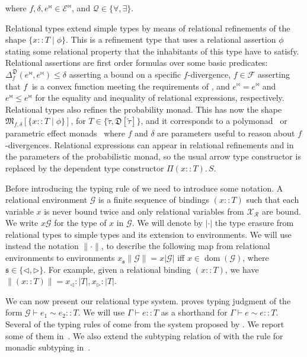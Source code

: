 \documentclass{sig-alternate-05-2015}
\theoremstyle{plain}
\theoremstyle{definition}
\theoremstyle{corollary}
\newcommand{\coty}[1]{\widetilde{#1}}
\def\lvmark{\triangleleft}
\def\rvmark{\triangleright}
\renewcommand{\l}[1]{#1_\lvmark}
\renewcommand{\r}[1]{#1_\rvmark}
\def\svar{\mathfrak{s}}
\newcommand{\rembed}[1]{|{#1}|}
\newcommand{\rrembed}[1]{\|{#1}\|}
\newcommand{\rmark}[1]{{#1}^{\Join}}
\def\rvars{\ensuremath{\mathcal{X}_{\mathcal{R}}}\xspace}
\newcommand{\expr}[0]{\ensuremath{\mathcal{E}}}
\newcommand{\rexpr}[0]{\ensuremath{\expr^{\Join}}}
\newcommand{\rtmod}[3]{\mathfrak{M}_{#1,#2}[{#3}]}
\newcommand{\rtprod}[3]{\Pi ({#1} :: {#2}) .\, {#3}}
\newcommand{\rtref}[3]{\{ {#1} :: {#2} \vbar {#3} \}}
\def\quantvar{\mathcal{Q}}
\newcommand{\renv}[1]{\mathcal{#1}}
\DeclareMathOperator{\dom}{dom}
\newcommand{\vbar}[0]{\mathrel{|}}
\newcommand{\stdist}[1]{\mathfrak{D}[{#1}]}
\newcommand{\fdiv}{\ensuremath{f}}
\begin{document}
\noindent where $\fdiv, \delta, \rmark{e} \in \rexpr$,
and $\quantvar\in\{\forall, \exists\}$.

Relational types extend simple types by means of relational
refinements of the shape $\rtref{x}{T}{\phi}$. This is a refinement
type that uses a relational assertion $\phi$ stating some relational
property that the inhabitants of this type have to satisfy. Relational
assertions are first order formulas over some basic predicates:
$\Delta^{\mathfrak{D}}_\fdiv(\rmark{e},\rmark{e})\leq \delta$
asserting a bound on a specific \fdiv-divergence,
$\fdiv\in\mathcal{F}$ asserting that \fdiv$\ $ is a convex function
meeting the requirements of , and 
$\rmark{e} = \rmark{e}$ and $\rmark{e} \le \rmark{e}$ for the equality
and inequality of relational expressions, respectively. 
Relational types also refines the probability monad. This has now the
shape $\rtmod{\fdiv}{\delta}{\rtref{x}{T}{\phi}}$, for
$T\in\{\coty{\tau},\stdist{\coty{\tau}}\}$, and  it corresponds to a
polymonad~\citep{HicksBGLS14} or parametric effect monads~\citep{Katsumata14} where $\fdiv$ and $\delta$ are parameters useful to
reason about \fdiv-divergences. Relational expressions can appear in relational refinements
and in the parameters of the probabilistic monad, so the usual
arrow type constructor is replaced by the dependent type constructor
$\rtprod{x}{T}{S}$.


Before introducing the typing rule of \THESYSTEM we need to introduce
some notation. A relational environment $\renv{G}$ is a finite
sequence of bindings $(x :: T)$ such that each variable $x$ is never
bound twice and only relational variables from $\rvars$ are bound.  We
write $x\renv{G}$ for the type of $x$ in $\renv{G}$.  We will denote
by $\rembed{\cdot}$ the type erasure from relational types to simple
types and its extension to environments. We will use instead the
notation $\rrembed{\cdot}$, to describe the following map from
relational environments to environments $x_\svar\rrembed{\renv{G}} =
x\rembed{\renv{G}}$ iff $x\in \dom(\renv{G})$, where $\svar \in \{
\lvmark, \rvmark \}$. For example, given a relational binding $(x::T)$,
we have $\rrembed{(x::T)}= \l{x}:\rembed{T},\r{x}:\rembed{T}$.

We can now present our relational type system. \THESYSTEM proves
typing judgment of the form $\renv{G} \vdash e_1 \sim e_2 :: T$.  We
will use $\Gamma \vdash e :: T$ as a shorthand for $\Gamma \vdash e
\sim e :: T$. Several of the typing rules of \THESYSTEM come from the
system proposed by \citet{BartheGAHRS15}. We report some of them
in~. We also extend the subtyping relation of \citet{BartheGAHRS15}
with the rule for monadic subtyping in~. 
\end{document}
